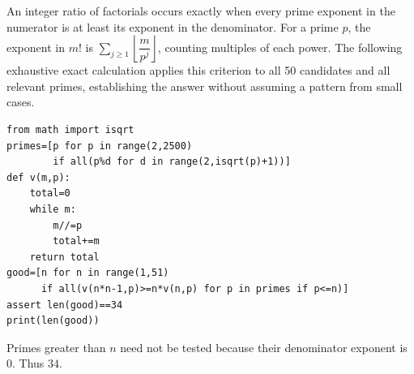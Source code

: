 An integer ratio of factorials occurs exactly when every prime exponent in the numerator is at least its exponent in the denominator. For a prime $p$, the exponent in $m!$ is $\sum_{j\ge1}\left\lfloor\dfrac{m}{p^j}\right\rfloor$, counting multiples of each power. The following exhaustive exact calculation applies this criterion to all 50 candidates and all relevant primes, establishing the answer without assuming a pattern from small cases.
\begin{verbatim}
from math import isqrt
primes=[p for p in range(2,2500)
        if all(p%d for d in range(2,isqrt(p)+1))]
def v(m,p):
    total=0
    while m:
        m//=p
        total+=m
    return total
good=[n for n in range(1,51)
      if all(v(n*n-1,p)>=n*v(n,p) for p in primes if p<=n)]
assert len(good)==34
print(len(good))
\end{verbatim}
Primes greater than $n$ need not be tested because their denominator exponent is 0. Thus $\boxed{34}$.
